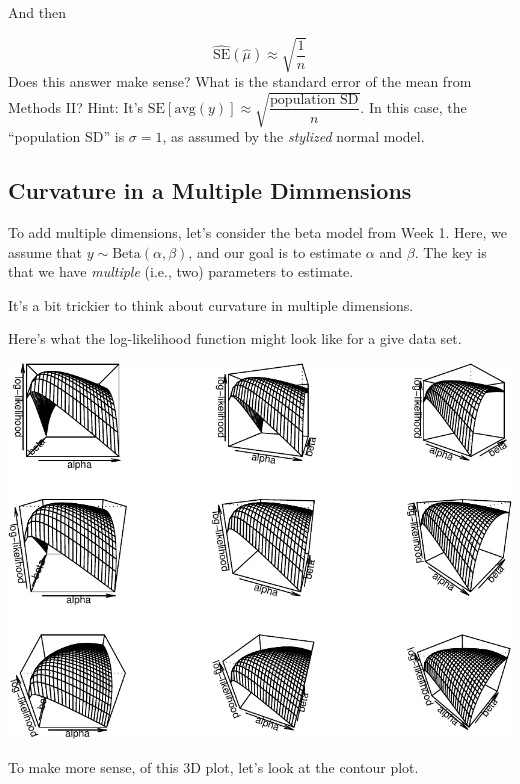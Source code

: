 \documentclass[
]{book}
\begin{document}
And then

\[
\begin{equation*}
\widehat{\text{SE}}(\hat{\mu}) \approx \sqrt{\dfrac{1}{n}} 
\end{equation*}
\]
Does this answer make sense? What is the standard error of the mean from Methods II? Hint: It's \(\text{SE}[\text{avg}(y)] \approx \sqrt{\dfrac{\text{population SD}}{n}}\). In this case, the ``population SD'' is \(\sigma = 1\), as assumed by the \emph{stylized} normal model.

\hypertarget{curvature-in-a-multiple-dimmensions}{%
\subsection{Curvature in a Multiple Dimmensions}\label{curvature-in-a-multiple-dimmensions}}

To add multiple dimensions, let's consider the beta model from Week 1. Here, we assume that \(y \sim \text{Beta}(\alpha, \beta)\), and our goal is to estimate \(\alpha\) and \(\beta\). The key is that we have \emph{multiple} (i.e., two) parameters to estimate.

It's a bit trickier to think about curvature in multiple dimensions.

Here's what the log-likelihood function might look like for a give data set.

\includegraphics{04-02-wald-cis_files/figure-latex/unnamed-chunk-3-1.pdf}

To make more sense, of this 3D plot, let's look at the contour plot.
\end{document}
